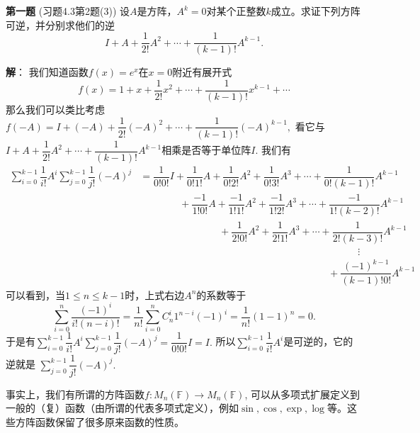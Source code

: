 
\date{2022-11-18 第六次习题课}
\author{}



\maketitle


{\bf 第一题} (习题4.3第2题(3)) 设$A$是方阵，$A^k = 0$对某个正整数$k$成立。求证下列方阵可逆，并分别求他们的逆
$$I + A + \dfrac{1}{2!}A^2 + \cdots + \dfrac{1}{(k-1)!}A^{k-1}.$$

\ifIncludeAnswer

\newpageorvspace

{\bf 解}： 我们知道函数$f(x) = e^x$在$x = 0$附近有展开式
$$f(x) = 1 + x + \dfrac{1}{2!}x^2 + \cdots + \dfrac{1}{(k-1)!}x^{k-1} + \cdots$$
那么我们可以类比考虑$f(-A) = I + (-A) + \dfrac{1}{2!}(-A)^2 + \cdots + \dfrac{1}{(k-1)!}(-A)^{k-1},$ 看它与$I + A + \dfrac{1}{2!}A^2 + \cdots + \dfrac{1}{(k-1)!}A^{k-1}$相乘是否等于单位阵$I.$ 我们有
\begin{align*}
\sum\limits_{i=0}^{k-1} \dfrac{1}{i!} A^i \sum\limits_{j=0}^{k-1} \dfrac{1}{j!} (-A)^j & = \dfrac{1}{0!0!} I + \dfrac{1}{0!1!} A + \dfrac{1}{0!2!} A^2 + \dfrac{1}{0!3!} A^3 + \cdots + \dfrac{1}{0!(k-1)!} A^{k-1} \\
& \hspace{4em} + \dfrac{-1}{1!0!} A + \dfrac{-1}{1!1!} A^2 + \dfrac{-1}{1!2!} A^3 + \cdots + \dfrac{-1}{1!(k-2)!} A^{k-1} \\
& \hspace{8em} + \dfrac{1}{2!0!} A^2 + \dfrac{1}{2!1!} A^3 + \cdots + \dfrac{1}{2!(k-3)!} A^{k-1} \\
& \hspace{22em} \vdots \\
& \hspace{19em} + \dfrac{(-1)^{k-1}}{(k-1)!0!} A^{k-1}
\end{align*}
可以看到，当$1\leqslant n \leqslant k-1$时，上式右边$A^n$的系数等于
$$\sum\limits_{i=0}^n \dfrac{(-1)^i}{i!(n-i)!} = \dfrac{1}{n!} \sum\limits_{i=0}^n C_n^i 1^{n-i} (-1)^i = \dfrac{1}{n!} (1-1)^n = 0.$$
于是有$\sum\limits_{i=0}^{k-1} \dfrac{1}{i!} A^i \sum\limits_{j=0}^{k-1} \dfrac{1}{j!} (-A)^j = \dfrac{1}{0!0!} I = I.$ 所以$\sum\limits_{i=0}^{k-1} \dfrac{1}{i!} A^i$是可逆的，它的逆就是 $\sum\limits_{j=0}^{k-1} \dfrac{1}{j!} (-A)^j.$

事实上，我们有所谓的方阵函数$f: M_n(\mathbb{F}) \to M_n(\mathbb{F})$, 可以从多项式扩展定义到一般的（复）函数（由所谓的代表多项式定义），例如$\sin, \cos, \exp, \log$等。这些方阵函数保留了很多原来函数的性质。

\fi  %


